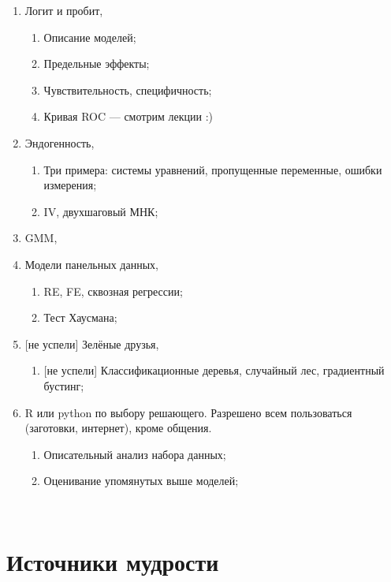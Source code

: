 \documentclass[12pt]{article}
\begin{document}
\begin{enumerate}
 \item Логит и пробит,  \cite{schmidheiny2016guides}
 \begin{enumerate}
 \item Описание моделей;
 \item Предельные эффекты;
 \item Чувствительность, специфичность;
 \item Кривая ROC — смотрим лекции :)
 \end{enumerate}

 \item Эндогенность,  \cite{schmidheiny2016guides}
 \begin{enumerate}
 \item Три примера: системы уравнений, пропущенные переменные, ошибки измерения;
 \item IV, двухшаговый МНК;
 \end{enumerate}

 \item GMM, \cite{creel2018econometrics}

 \item Модели панельных данных, \cite{schmidheiny2016guides}
 \begin{enumerate}
 \item  RE, FE, сквозная регрессии;
 \item  Тест Хаусмана;
 \end{enumerate}

 \item {[не успели]} Зелёные друзья, \cite{decrouez2018mmdm}
 \begin{enumerate}
 \item {[не успели]} Классификационные деревья, случайный лес, градиентный бустинг;
 \end{enumerate}

 \item R или python по выбору решающего. Разрешено всем пользоваться (заготовки, интернет), кроме общения.
 \begin{enumerate}
 \item Описательный анализ набора данных;
 \item Оценивание упомянутых выше моделей;
 \end{enumerate}

\end{enumerate}
­
\section*{Источники мудрости}
\printbibliography[heading=none]
\end{document}
